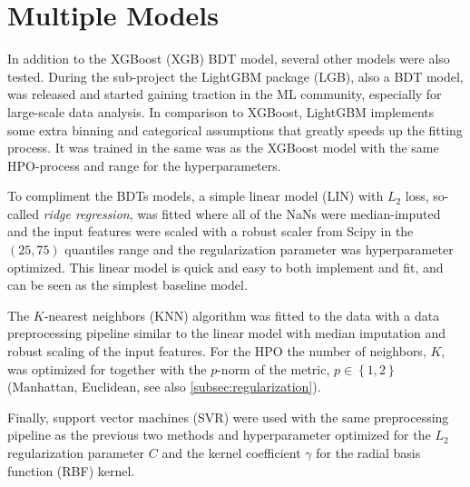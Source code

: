 \FloatBarrier
\section{Multiple Models}
\label{sec:h:multiple_models}

In addition to the XGBoost \autocite{chenXGBoostScalableTree2016} (XGB) BDT model, several other models were also tested. During the sub-project the LightGBM package \autocite{keLightGBMHighlyEfficient2017} (LGB), also a BDT model, was released and started gaining traction in the ML community, especially for large-scale data analysis. In comparison to XGBoost, LightGBM implements some extra binning and categorical assumptions that greatly speeds up the fitting process. It was trained in the same was as the XGBoost model with the same HPO-process and range for the hyperparameters. 

To compliment the BDTs models, a simple linear model (LIN) with $L_2$ loss, so-called \emph{ridge regression}, was fitted where all of the NaNs were median-imputed and the input features were scaled with a robust scaler from Scipy \autocite{virtanenSciPyFundamentalAlgorithms2019} in the $(25, 75)$ quantiles range and the regularization parameter was hyperparameter optimized. This linear model is quick and easy to both implement and fit, and can be seen as the simplest baseline model.

The $K$-nearest neighbors (KNN) algorithm was fitted to the data with a data preprocessing pipeline similar to the linear model with median imputation and robust scaling of the input features. For the HPO the number of neighbors, $K$, was optimized for together with the $p$-norm of the metric, $p \in \left\{ 1, 2\right\}$ (Manhattan, Euclidean, see also \autoref{subsec:regularization}).

Finally, support vector machines (SVR) were used with the same preprocessing pipeline as the previous two methods and hyperparameter optimized for the $L_2$ regularization parameter $C$ and the kernel coefficient $\gamma$ for the radial basis function (RBF) kernel. 


